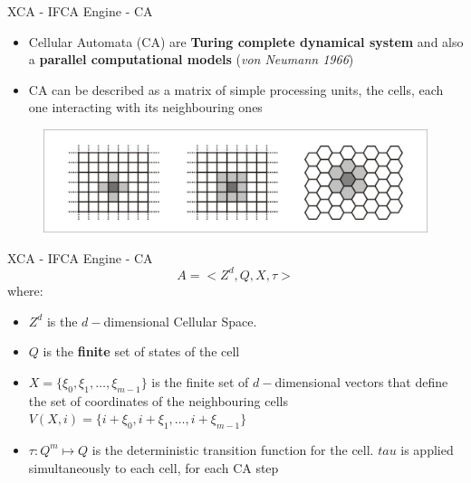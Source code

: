 \documentclass{beamer}
\begin{document}
		\begin{frame}{XCA - IFCA Engine - CA}
			\begin{itemize}
			\item Cellular Automata (CA) are \textbf{Turing complete dynamical system} and also a \textbf{parallel computational models} (\textit{von Neumann 1966})
			\item CA can be described as a matrix of simple processing units, the cells, each one interacting with its neighbouring ones

			\end{itemize}
					\begin{figure}
					\centering
					\includegraphics[scale=0.68]{./images/CA}
				\end{figure}
		\end{frame}
		\begin{frame}{XCA - IFCA Engine - CA}
		\[
			A = \Big<Z^d , Q, X, \tau \Big>		
		\] where:
		\begin{itemize}
		 \item $Z^d$ is the $d-$dimensional Cellular Space.
		 \item $Q$ is the \textbf{finite} set of states of the cell
		 \item $X = \{\xi_0, \xi_1, \ldots , \xi_{m-1}\}$ is the finite set of $d-$dimensional vectors that define the set of coordinates of the neighbouring cells $V(X,i)=\{i+\xi_0, i+\xi_{1},\ldots, i+\xi_{m-1}\}$

		 \item $\tau: Q^m \mapsto  Q$ is the deterministic transition function for the cell. $tau$ is applied simultaneously to each cell, for each CA step
		\end{itemize}
		\end{frame}
		
\end{document}

